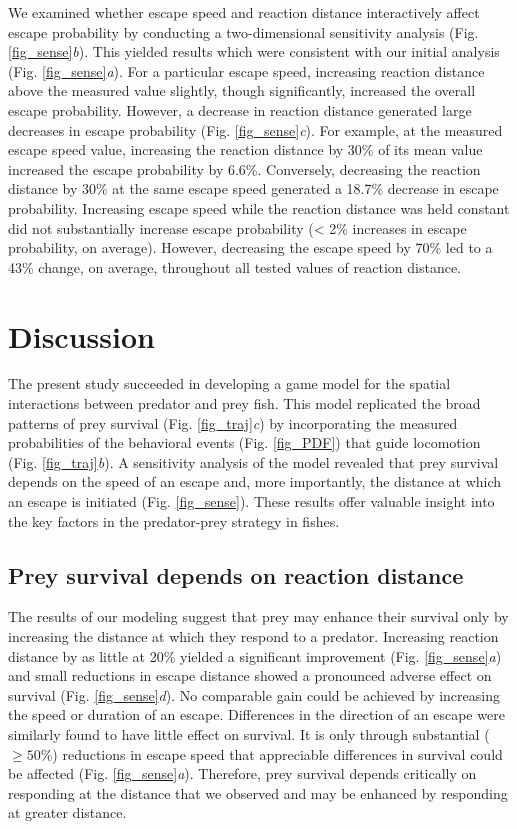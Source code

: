 \documentclass[]{rsos}%
\begin{document}
We examined whether escape speed and reaction distance interactively affect escape probability by conducting a two-dimensional sensitivity analysis (Fig. \ref{fig_sense}\textit{b}).
This yielded results which were consistent with our initial analysis (Fig. \ref{fig_sense}\textit{a}). 
For a particular escape speed, increasing reaction distance above the measured value slightly, though significantly, increased the overall escape probability. 
However, a decrease in reaction distance generated large decreases in escape probability (Fig. \ref{fig_sense}\textit{c}). 
For example, at the measured escape speed value, increasing the reaction distance by 30\% of its mean value increased the escape probability by 6.6\%. 
Conversely, decreasing the reaction distance by 30\% at the same escape speed generated a 18.7\% decrease in escape probability.
Increasing escape speed while the reaction distance was held constant did not substantially increase escape probability (< 2\% increases in escape probability, on average).
However, decreasing the escape speed by 70\% led to a 43\% change, on average, throughout all tested values of reaction distance.



\section{Discussion} %

The present study succeeded in developing a game model for the spatial interactions between predator and prey fish. 
This model replicated the broad patterns of prey survival (Fig. \ref{fig_traj}\textit{c}) by incorporating the measured probabilities of the behavioral events (Fig. \ref{fig_PDF}) that guide locomotion (Fig. \ref{fig_traj}\textit{b}).
A sensitivity analysis of the model revealed that prey survival depends on the speed of an escape and, more importantly, the distance at which an escape is initiated (Fig. \ref{fig_sense}). 
These results offer valuable insight into the key factors in the predator-prey strategy in fishes. 

\subsection{Prey survival depends on reaction distance} 

The results of our modeling suggest that prey may enhance their survival only by increasing the distance at which they respond to a predator. 
Increasing reaction distance by as little at 20\% yielded a significant improvement (Fig. \ref{fig_sense}\textit{a}) and small reductions in escape distance showed a pronounced adverse effect on survival (Fig. \ref{fig_sense}\textit{d}).
No comparable gain could be achieved by increasing the speed or duration of an escape.
Differences in the direction of an escape were similarly found to have little effect on survival.
It is only through substantial ($\geq 50\%$) reductions in escape speed that appreciable differences in survival could be affected (Fig. \ref{fig_sense}\textit{a}).
Therefore, prey survival depends critically on responding at the distance that we observed and may be enhanced by responding at greater distance.
\end{document}
